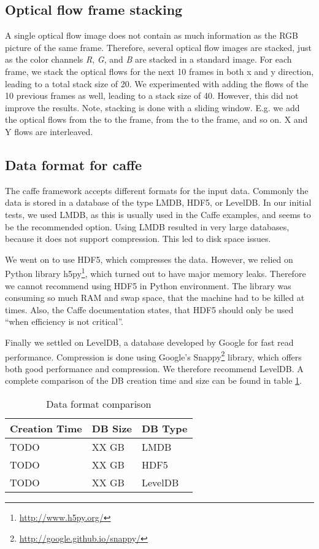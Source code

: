 
\subsection{Optical flow frame stacking}
A single optical flow image does not contain as much information as the RGB picture of the same frame.
Therefore, several optical flow images are stacked, just as the color channels \emph{R}, \emph{G}, and \emph{B} are stacked in a standard image.
For each frame, we stack the optical flows for the next 10 frames in both x and y direction, leading to a total stack size of 20.
We experimented with adding the flows of the 10 previous frames as well, leading to a stack size of 40.
However, this did not improve the results.
Note, stacking is done with a sliding window. E.g. we add the optical flows from the  to the  frame, from the  to the  frame, and so on. X and Y flows are interleaved.


\subsection{Data format for caffe}
The caffe framework accepts different formats for the input data. Commonly the data is stored in a database of the type LMDB, HDF5, or LevelDB.
In our initial tests, we used LMDB, as this is usually used in the Caffe examples, and seems to be the recommended option.
Using LMDB resulted in very large databases, because it does not support compression.
This led to disk space issues.

We went on to use HDF5, which compresses the data.
However, we relied on Python library h5py\footnote{\url{http://www.h5py.org/}}, which turned out to have major memory leaks. Therefore we cannot recommend using HDF5 in Python environment.
The library was consuming so much RAM and swap space, that the machine had to be killed at times.
Also, the Caffe documentation states, that HDF5 should only be used ``when efficiency is not critical''.

Finally we settled on LevelDB, a database developed by Google for fast read performance.
Compression is done using Google's Snappy\footnote{\url{http://google.github.io/snappy/}} library, which offers both good performance and compression.
We therefore recommend LevelDB. A complete comparison of the DB creation time and size can be found in table \ref{table:databases}.

\begin{table}[H]
\centering
\caption{Data format comparison}
\label{table:databases}
\begin{tabular}{lll}
\toprule
Creation Time 		& DB Size  & DB Type \\ \midrule
TODO           & XX GB  	 & LMDB \\
TODO          		& XX GB  	 & HDF5 \\
TODO          		& XX GB  	 & LevelDB \\
\bottomrule
\end{tabular}
\end{table}

